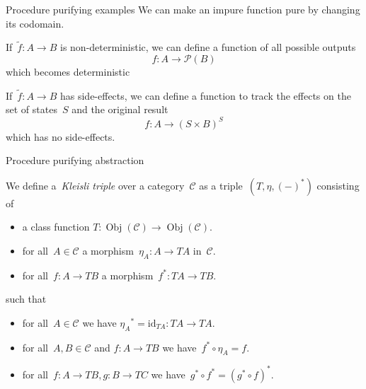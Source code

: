 \documentclass{beamer}
\newcommand{\cat}[1]{\mathcal{#1}}
\newcommand{\id}{\mathrm{id}}
\DeclareMathOperator{\Obj}{Obj}
\begin{document}
\begin{frame}{Procedure purifying examples}
    We can make an impure function pure by changing its codomain.

    \begin{example}
        If~\(\tilde{f}:A\longrightarrow B\) is non-deterministic, we can define
        a function of all possible outputs
        \[
            f:A\longrightarrow\mathcal{P}(B)
        \]
        which becomes deterministic
    \end{example}

    \begin{example}
        If~\(\tilde{f}:A\longrightarrow B\) has side-effects, we can define a
        function to track the effects on the set of states~\(S\) and the
        original result
        \[
            f:A\longrightarrow(S\times B)^{S}
        \]
        which has no side-effects.
    \end{example}
\end{frame}

\begin{frame}{Procedure purifying abstraction}
    \begin{definition}
        We define a~\emph{Kleisli triple} over a category~\(\cat{C}\) as a
        triple~\((T,\eta,(-)^{\ast})\) consisting of
        \begin{itemize}
            \item a class function
                \(T:\Obj(\cat{C})\longrightarrow\Obj(\cat{C})\).

            \item for all~\(A\in\cat{C}\)
                a morphism~\(\eta_{A}:A\longrightarrow TA\)
                in~\(\cat{C}\).

            \item for all~\(f:A\longrightarrow TB\) a
                morphism~\(f^{\ast}:TA\longrightarrow TB\).
        \end{itemize}
        such that
        \begin{itemize}
            \item for all~\(A\in\cat{C}\) we have
                \({\eta_{A}}^{\ast} = \id_{TA}:TA\longrightarrow TA\).

            \item for all~\(A,B\in\cat{C}\) and \(f:A\longrightarrow TB\) we
                have~\(f^{\ast}\circ\eta_{A} = f\).

            \item for all~\(f:A\to TB,g:B\to TC\) we
                have~\(g^{\ast}\circ f^{\ast} = (g^{\ast}\circ f)^{\ast}\).
        \end{itemize}
    \end{definition}
\end{frame}
\end{document}
